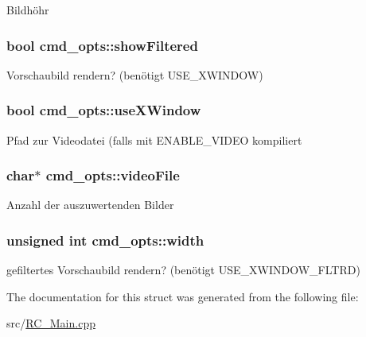 Bildhöhr \hypertarget{structcmd__opts_ab2a0a976837dc40909f765546c60c4c9}{
\subsubsection[{show\+Filtered}]{\setlength{\rightskip}{0pt plus 5cm}bool cmd\+\_\+opts\+::show\+Filtered}}\label{structcmd__opts_ab2a0a976837dc40909f765546c60c4c9}
Vorschaubild rendern? (benötigt U\+S\+E\+\_\+\+X\+W\+I\+N\+D\+O\+W) \hypertarget{structcmd__opts_aee44e8161de659e8fff50e09100f9ada}{
\subsubsection[{use\+X\+Window}]{\setlength{\rightskip}{0pt plus 5cm}bool cmd\+\_\+opts\+::use\+X\+Window}}\label{structcmd__opts_aee44e8161de659e8fff50e09100f9ada}
Pfad zur Videodatei (falls mit E\+N\+A\+B\+L\+E\+\_\+\+V\+I\+D\+E\+O kompiliert \hypertarget{structcmd__opts_acee5a1c6793898bbda38d6d7fb5de431}{
\subsubsection[{video\+File}]{\setlength{\rightskip}{0pt plus 5cm}char$\ast$ cmd\+\_\+opts\+::video\+File}}\label{structcmd__opts_acee5a1c6793898bbda38d6d7fb5de431}
Anzahl der auszuwertenden Bilder \hypertarget{structcmd__opts_a0f13b6290e7e33c22a258c11ed23f72f}{
\subsubsection[{width}]{\setlength{\rightskip}{0pt plus 5cm}unsigned int cmd\+\_\+opts\+::width}}\label{structcmd__opts_a0f13b6290e7e33c22a258c11ed23f72f}
gefiltertes Vorschaubild rendern? (benötigt U\+S\+E\+\_\+\+X\+W\+I\+N\+D\+O\+W\+\_\+\+F\+L\+T\+R\+D) 

The documentation for this struct was generated from the following file\+:\begin{DoxyCompactItemize}
\item 
src/\hyperlink{RC__Main_8cpp}{R\+C\+\_\+\+Main.\+cpp}\end{DoxyCompactItemize}
